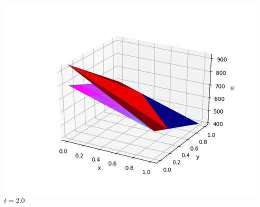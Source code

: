 \documentclass[]{beamer}
\begin{document}
\begin{frame}[t]
\begin{columns}
\begin{center}
			\includegraphics[scale=0.2]{figures/2D_xy_homog1mat_u_vs_x_20}\\
			$t=2.0$ \normalsize
			\end{center}
	\end{columns}
\end{frame}
\end{document}

